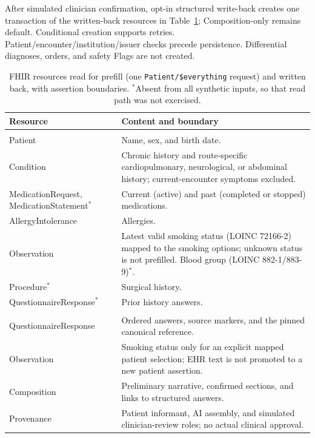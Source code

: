 \documentclass[lineno,pdflatex,sn-basic]{sn-jnl}%
\theoremstyle{thmstyleone}%
\theoremstyle{thmstyletwo}%
\theoremstyle{thmstylethree}%
\begin{document}
After simulated clinician confirmation, opt-in structured write-back creates
one transaction of the written-back resources in Table~\ref{tab:fhir};
Composition-only remains default. Conditional
creation supports retries. Patient/encounter/institution/issuer checks precede
persistence. Differential diagnoses, orders, and safety Flags are not created.

\begin{table}[t]\centering\small
\caption{FHIR resources read for prefill (one \texttt{Patient/\$everything} request)
and written back, with assertion boundaries. $^\ast$Absent from all synthetic inputs,
so that read path was not exercised.}\label{tab:fhir}
\begin{tabular}{>{\raggedright\arraybackslash}p{3.4cm}p{8.1cm}}\hline
Resource & Content and boundary \\\hline
\multicolumn{2}{l}{\emph{Read for prefill}} \\
Patient & Name, sex, and birth date. \\
Condition & Chronic history and route-specific cardiopulmonary, neurological, or abdominal history; current-encounter symptoms excluded. \\
MedicationRequest, MedicationStatement$^\ast$ & Current (active) and past (completed or stopped) medications. \\
AllergyIntolerance & Allergies. \\
Observation & Latest valid smoking status (LOINC 72166-2) mapped to the smoking options; unknown status is not prefilled. Blood group (LOINC 882-1/883-9)$^\ast$. \\
Procedure$^\ast$ & Surgical history. \\
Questionnaire\-Response$^\ast$ & Prior history answers. \\\hline
\multicolumn{2}{l}{\emph{Written back}} \\
QuestionnaireResponse & Ordered answers, source markers, and the pinned canonical reference. \\
Observation & Smoking status only for an explicit mapped patient selection; EHR text is not promoted to a new patient assertion. \\
Composition & Preliminary narrative, confirmed sections, and links to structured answers. \\
Provenance & Patient informant, AI assembly, and simulated clinician-review roles; no actual clinical approval. \\\hline
\end{tabular}
\end{table}
\end{document}
